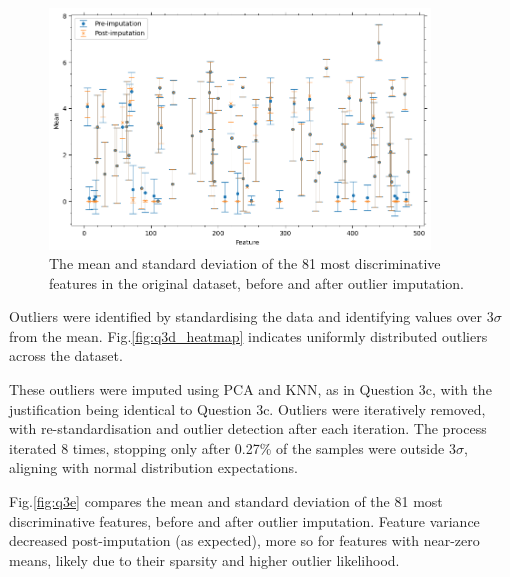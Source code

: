     \begin{figure}[htb]
    \centering
    \includegraphics[width=0.9\textwidth]{./figures/q3e}
    \caption{The mean and standard deviation of the 81 most discriminative features in the original
         dataset, before and after outlier imputation.}
    \label{fig:q3e}
    \end{figure}

    Outliers were identified by standardising the data and identifying values over $3\sigma$ from the mean.
    Fig.\eqref{fig:q3d_heatmap} indicates uniformly distributed outliers across the dataset.

    These outliers were imputed using PCA and KNN, as in Question 3c, with the justification being identical to
    Question 3c.
    Outliers were iteratively removed, with re-standardisation and outlier detection after each iteration.
    The process iterated 8 times, stopping only after 0.27\% of the samples were outside $3\sigma$, aligning with normal
    distribution expectations.

    Fig.\eqref{fig:q3e} compares the mean and standard deviation of the 81 most discriminative features, before and after
    outlier imputation.
    Feature variance decreased post-imputation (as expected), more so for features with near-zero means, likely due to
    their sparsity and higher outlier likelihood.
